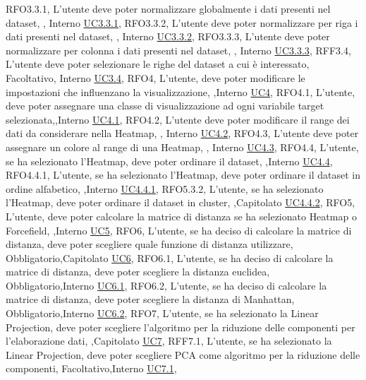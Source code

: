 {    {RFO3.3.1, L'utente deve poter normalizzare globalmente i dati presenti nel dataset, \obb, Interno \noexpand\hyperref[uc3.3.1]{UC3.3.1}},
    {RFO3.3.2, L'utente deve poter normalizzare per riga i dati presenti nel dataset, \obb, Interno \noexpand\hyperref[uc3.3.2]{UC3.3.2}},
    {RFO3.3.3, L'utente deve poter normalizzare per colonna i dati presenti nel dataset, \obb, Interno \noexpand\hyperref[uc3.3.3]{UC3.3.3}},
    {RFF3.4, L'utente deve poter selezionare le righe del dataset a cui è interessato, Facoltativo, Interno \noexpand\hyperref[uc3.4]{UC3.4}},
    {RFO4, L'utente{,} deve poter modificare le impostazioni che influenzano la visualizzazione, \obb,Interno \noexpand\hyperref[uc4]{UC4}},
    {RFO4.1, L'utente{,} deve poter assegnare una classe di visualizzazione ad ogni variabile target selezionata,\obb,Interno \noexpand\hyperref[uc4.1]{UC4.1}},
    {RFO4.2, L'utente deve poter modificare il range dei dati da considerare nella Heatmap, \obb, Interno \noexpand\hyperref[uc4.2]{UC4.2}},
    {RFO4.3, L'utente deve poter assegnare un colore al range di una Heatmap, \obb, Interno \noexpand\hyperref[uc4.3]{UC4.3}},
     {RFO4.4, L'utente{,} se ha selezionato l'Heatmap{,} deve poter ordinare il dataset, \obb,Interno \noexpand\hyperref[uc4.4]{UC4.4}},
    {RFO4.4.1, L'utente{,} se ha selezionato l'Heatmap{,} deve poter ordinare il dataset in ordine alfabetico, \obb,Interno \noexpand\hyperref[uc4.4.1]{UC4.4.1}},
    {RFO5.3.2, L'utente{,} se ha selezionato l'Heatmap{,} deve poter ordinare il dataset in cluster, \obb,Capitolato \noexpand\hyperref[uc4.4.2]{UC4.4.2}},
    {RFO5, L'utente{,} deve poter calcolare la matrice di distanza se ha selezionato Heatmap o Forcefield, \obb,Interno \noexpand\hyperref[uc5]{UC5}},
    {RFO6, L'utente{,} se ha deciso di calcolare la matrice di distanza{,} deve poter scegliere quale funzione di distanza utilizzare, Obbligatorio,Capitolato \noexpand\hyperref[uc6]{UC6}},
    {RFO6.1, L'utente{,} se ha deciso di calcolare la matrice di distanza{,} deve poter scegliere la distanza euclidea, Obbligatorio,Interno \noexpand\hyperref[uc6.1]{UC6.1}},
    {RFO6.2, L'utente{,} se ha deciso di calcolare la matrice di distanza{,} deve poter scegliere la distanza di Manhattan, Obbligatorio,Interno \noexpand\hyperref[uc6.2]{UC6.2}},
    {RFO7, L'utente{,} se ha selezionato la Linear Projection{,} deve poter scegliere l'algoritmo per la riduzione delle componenti per l'elaborazione dati, \obb,Capitolato \noexpand\hyperref[uc7]{UC7}},
    {RFF7.1, L'utente{,} se ha selezionato la Linear Projection{,} deve poter scegliere PCA come algoritmo per la riduzione delle componenti, Facoltativo,Interno \noexpand\hyperref[uc7.1]{UC7.1}},
}
